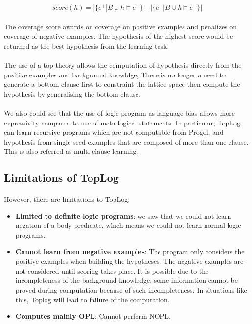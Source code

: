 \documentclass{article}
\theoremstyle{plain}
\theoremstyle{definition}
\begin{document}
\begin{multicols}{2}
$$score(h) = |\{e^+  | B \cup h \models e^+\}| - |\{e^- | B \cup h \models e^-\}|$$

\paragraph{} The coverage score awards on coverage on positive examples and penalizes on coverage of negative examples. The hypothesis of the highest score would be returned as the best hypothesis from the learning task.

\paragraph{} The use of a top-theory allows the computation of hypothesis directly from the positive examples and background knowldge, There is no longer a need to generate a bottom clause first to constraint the lattice space then compute the hypothesis by generalising the bottom clause.

\paragraph{} We also could see that the use of logic program as language bias allows more expressivity compared to use of meta-logical statements. In particular, TopLog can learn recursive programs which are not computable from Progol, and hypothesis from single seed examples that are composed of more than one clause. This is also referred as multi-clause learning. 

\subsection{Limitations of TopLog}

\paragraph{} However, there are limitations to TopLog:

\begin{itemize}
\item \textbf{Limited to definite logic programs}: we saw that we could not learn negation of a body predicate, which means we could not learn normal logic programs. 
\item \textbf{Cannot learn from negative examples}: The program only considers the positive examples when building the hypotheses. The negative examples are not considered until scoring takes place. It is possible due to the incompleteness of the background knowledge, some information cannot be proved during computation because of such incompleteness. In situations like this, Toplog will lead to failure of the computation. 
\item \textbf{Computes mainly OPL}: Cannot perform NOPL.
\end{itemize}


\end{multicols}
\end{document}

